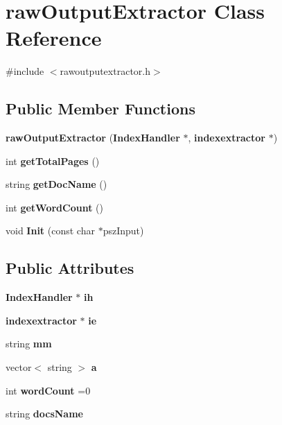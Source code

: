 \section{raw\+Output\+Extractor Class Reference}
\label{classraw_output_extractor}


{\ttfamily \#include $<$rawoutputextractor.\+h$>$}

\subsection*{Public Member Functions}
\begin{DoxyCompactItemize}
\item 
{\bfseries raw\+Output\+Extractor} ({\bf Index\+Handler} $\ast$, {\bf indexextractor} $\ast$)\label{classraw_output_extractor_a9f1429b521b00d304082bb6b6e7aa810}

\item 
int {\bfseries get\+Total\+Pages} ()\label{classraw_output_extractor_a306ee3750845f8343c312524ab56119f}

\item 
string {\bfseries get\+Doc\+Name} ()\label{classraw_output_extractor_aaa6eefc03308e4ab23e5a07fd14ffc94}

\item 
int {\bfseries get\+Word\+Count} ()\label{classraw_output_extractor_a96366fc0b002b56285146c0a813ad76f}

\item 
void {\bfseries Init} (const char $\ast$psz\+Input)\label{classraw_output_extractor_a085aa59c775749e1f56363e8c195f3ef}

\end{DoxyCompactItemize}
\subsection*{Public Attributes}
\begin{DoxyCompactItemize}
\item 
{\bf Index\+Handler} $\ast$ {\bfseries ih}\label{classraw_output_extractor_ad067d96f81f783c6f5bc20227806250b}

\item 
{\bf indexextractor} $\ast$ {\bfseries ie}\label{classraw_output_extractor_a60443cbf3cec7845e65acb58fefe369e}

\item 
string {\bfseries mm}\label{classraw_output_extractor_a2423c51cd2139ea3da4239b620a3e5ab}

\item 
vector$<$ string $>$ {\bfseries a}\label{classraw_output_extractor_a7466d30c2340396fcde7a185e4405e26}

\item 
int {\bfseries word\+Count} =0\label{classraw_output_extractor_a44ba737833045854b190a30fab86f8bd}

\item 
string {\bfseries docs\+Name}\label{classraw_output_extractor_a10e7d598053ca6ffaf7f053eb8f39127}

\end{DoxyCompactItemize}


